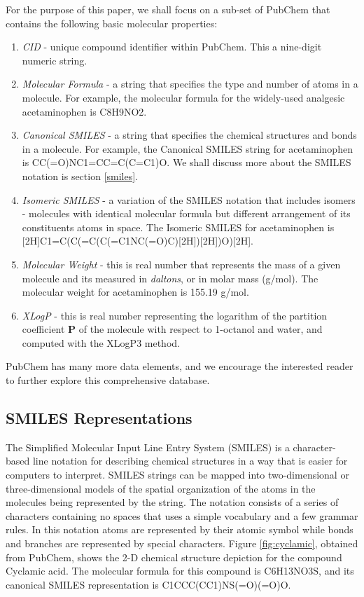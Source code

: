 For the purpose of this paper, we shall focus on a sub-set of PubChem that contains the following basic molecular properties:
\begin{enumerate}
	\item {\em CID} - unique compound identifier within PubChem. This a nine-digit numeric string. 
	\item {\em Molecular Formula} -  a string that specifies the type and number of atoms in a molecule. For example, the molecular formula for the widely-used analgesic acetaminophen is C8H9NO2.
	\item {\em Canonical SMILES} - a string that specifies the chemical structures and bonds in a molecule. For example, the Canonical SMILES string for acetaminophen is CC(=O)NC1=CC=C(C=C1)O. We shall discuss more about the SMILES notation is section \ref{smiles}.
	\item {\em Isomeric SMILES} - a variation of the SMILES notation that includes isomers - molecules with identical molecular formula but different arrangement of its constituents atoms in space. The Isomeric SMILES for acetaminophen is [2H]C1=C(C(=C(C(=C1NC(=O)C)[2H])[2H])O)[2H].
	\item {\em Molecular Weight} - this is real number that represents the mass of a given molecule and its measured in {\em daltons}, or in molar mass (g/mol). The molecular weight for acetaminophen is 155.19 g/mol.
	\item {\em XLogP} - this is real number representing the logarithm of the partition coefficient $\boldsymbol P$ of the molecule with respect to 1-octanol and water, and computed with the XLogP3 method. 
\end{enumerate}
PubChem has many more data elements, and we encourage the interested reader to further explore this comprehensive database. 

\subsection{SMILES Representations\label{smiles}}
The Simplified Molecular Input Line Entry System (SMILES) is a character-based line notation for describing chemical structures in a way that is easier for computers to interpret. SMILES strings can be mapped into two-dimensional or three-dimensional models of the spatial organization of the atoms in the molecules being represented by the string. The notation consists of a series of characters containing no spaces that uses a simple vocabulary and a few grammar rules. In this notation atoms are represented by their atomic symbol while bonds and branches are represented by special characters. Figure \ref{fig:cyclamic}, obtained from PubChem,  shows the 2-D chemical structure depiction for the compound Cyclamic acid. The molecular formula for this compound is C6H13NO3S, and its canonical SMILES representation is C1CCC(CC1)NS(=O)(=O)O.

